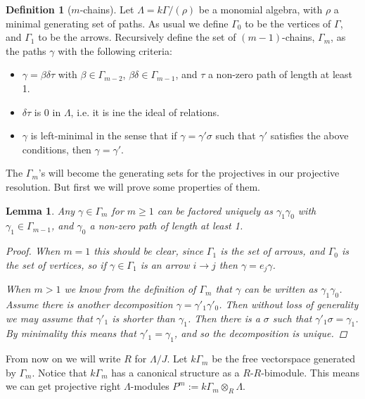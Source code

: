 \documentclass[11pt, a4paper, english]{article}
\newtheorem{lemma}[theorem]{Lemma}
\theoremstyle{definition}
\newtheorem{defn}[theorem]{Definition}
\begin{document}
\begin{defn}[$m$-chains]\cite{GKK91}
	Let $\Lambda = k\Gamma / (\rho)$ be a monomial algebra, with $\rho$ a minimal generating set of paths. As usual we define $\Gamma_0$ to be the vertices of $\Gamma$, and $\Gamma_1$ to be the arrows. Recursively define the set of $(m-1)$-chains, $\Gamma_m$, as the paths $\gamma$ with the following criteria:
	\begin{itemize}
		\item $\gamma = \beta\delta\tau$ with $\beta \in \Gamma_{m-2}$, $\beta\delta \in \Gamma_{m-1}$, and $\tau$ a non-zero path of length at least 1.
		\item $\delta\tau$ is 0 in $\Lambda$, i.e. it is ine the ideal of relations.
		\item $\gamma$ is left-minimal in the sense that if $\gamma = \gamma' \sigma$ such that $\gamma'$ satisfies the above conditions, then $\gamma = \gamma'$.
	\end{itemize}
\end{defn}

The $\Gamma_m$'s will become the generating sets for the projectives in our projective resolution. But first we will prove some properties of them.

\begin{lemma}
	Any $\gamma\in \Gamma_m$ for $m \geq 1$ can be factored uniquely as $\gamma_1\gamma_0$ with $\gamma_1 \in \Gamma_{m-1}$, and $\gamma_0$ a non-zero path of length at least 1.
	\begin{proof}
		When $m=1$ this should be clear, since $\Gamma_1$ is the set of arrows, and $\Gamma_0$ is the set of vertices, so if $\gamma \in \Gamma_1$ is an arrow $i\to j$ then $\gamma = e_j\gamma$.
		
		When $m > 1$ we know from the definition of $\Gamma_m$ that $\gamma$ can be written as $\gamma_1\gamma_0$. Assume there is another decomposition $\gamma = \gamma'_1\gamma'_0$. Then without loss of generality we may assume that $\gamma'_1$ is shorter than $\gamma_1$. Then there is a $\sigma$ such that $\gamma'_1\sigma = \gamma_1$. By minimality this means that $\gamma'_1=\gamma_1$, and so the decomposition is unique.
	\end{proof} 
\end{lemma} 

From now on we will write $R$ for $\Lambda/J$. Let $k\Gamma_m$ be the free vectorspace generated by $\Gamma_m$. Notice that $k\Gamma_m$ has a canonical structure as a $R$-$R$-bimodule. This means we can get projective right $\Lambda$-modules $P^m := k\Gamma_m\otimes_R\Lambda$.
\end{document}

